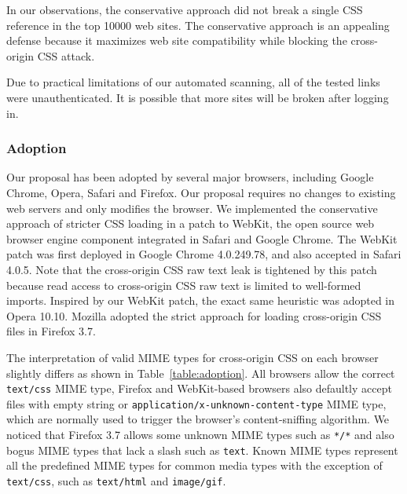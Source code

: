 \documentclass{acm_proc_article-sp}
\begin{document}
In our observations, the conservative approach did not break a single CSS reference in the top 10000 web sites. The conservative approach is an appealing defense because it maximizes web site compatibility while blocking the cross-origin CSS attack.

Due to practical limitations of our automated scanning, all of the tested links were unauthenticated. It is possible that more sites will be broken after logging in.

\subsubsection{Adoption}
Our proposal has been adopted by several major browsers, including Google Chrome, Opera, Safari and Firefox. Our proposal requires no changes to existing web servers and only modifies the browser. We implemented the conservative approach of stricter CSS loading in a patch to WebKit, the open source web browser engine component integrated in Safari and Google Chrome. The WebKit patch was first deployed in Google Chrome 4.0.249.78, and also accepted in Safari 4.0.5. Note that the cross-origin CSS raw text leak is tightened by this patch because read access to cross-origin CSS raw text is limited to well-formed imports. Inspired by our WebKit patch, the exact same heuristic was adopted in Opera 10.10. Mozilla adopted the strict approach for loading cross-origin CSS files in Firefox 3.7.

The interpretation of valid MIME types for cross-origin CSS on each browser slightly differs as shown in Table~\ref{table:adoption}. All browsers allow the correct \texttt{text/css} MIME type, Firefox and WebKit-based browsers also defaultly accept files with empty string or \texttt{application/x-unknown-content-type} MIME type, which are normally used to trigger the browser's content-sniffing algorithm. We noticed that Firefox 3.7 allows some unknown MIME types such as \texttt{*/*} and also bogus MIME types that lack a slash such as \texttt{text}. Known MIME types represent all the predefined MIME types for common media types with the exception of \texttt{text/css}, such as \texttt{text/html} and \texttt{image/gif}.
\end{document}
